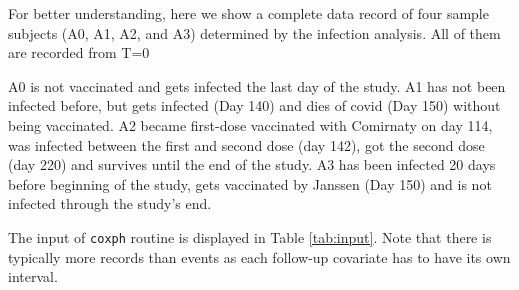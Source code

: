 \documentclass[preprint,12pt,authoryear]{elsarticle}
\begin{document}
For better understanding, here we show a complete data record of four sample subjects (A0, A1, A2, and A3) determined by the infection analysis. All of them are recorded from T=0 

A0 is not vaccinated and gets infected the last day of the study.
A1 has not been infected before, but gets infected (Day 140) and dies of covid (Day 150) without being vaccinated. A2 became first-dose vaccinated with Comirnaty on day 114, was infected between the first and second dose (day 142), got the second dose (day 220) and survives until the end of the study. A3 has been infected 20 days before beginning of the study, gets vaccinated by Janssen (Day 150) and is not infected through the study's end. 

The input of {\tt coxph} routine is displayed in Table \ref{tab:input}. Note that there is typically more records than events as each follow-up covariate has to have its own interval.
\end{document}
